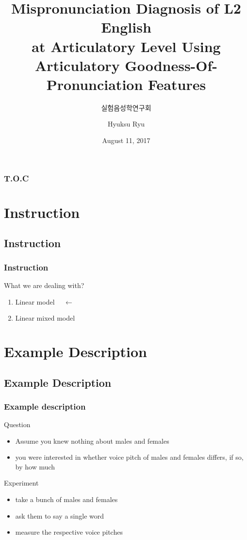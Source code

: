 \documentclass{beamer}\usepackage[]{graphicx}\usepackage[]{color}
\title[Mispronunciation Diagnosis]{Mispronunciation Diagnosis of L2 English\\
at Articulatory Level Using Articulatory Goodness-Of-Pronunciation Features}
\subtitle[실험음성학연구회]{실험음성학연구회}
\author[Ryu et al.]{Hyuksu Ryu\inst{1}}
\institute[Naver Clova]{\inst{1} Naver Clova}
\date{August 11, 2017}
\begin{document}
\begin{frame}
\maketitle
\end{frame}

\begin{frame}
\frametitle{T.O.C}
	\tableofcontents[subsectionstyle=hide]
\end{frame}

\section{Instruction}
\subsection{Instruction}

\begin{frame}
\frametitle{Instruction}
What we are dealing with?
\begin{enumerate}
\item \alert{Linear model} $\quad \leftarrow$
\item Linear mixed model
\end{enumerate}
\end{frame}

\section{Example Description}
\subsection{Example Description}

\begin{frame}
\frametitle{Example description}
Question
\begin{itemize}
\item Assume you knew nothing about males and females
\item you were interested in whether \alert{voice pitch} of males and females differs, if so, by how much
\end{itemize}

\vspace{9pt}
Experiment
\begin{itemize}
\item take a bunch of males and females
\item ask them to say a single word
\item measure the respective voice pitches
\end{itemize}

\end{frame}
\end{document}
